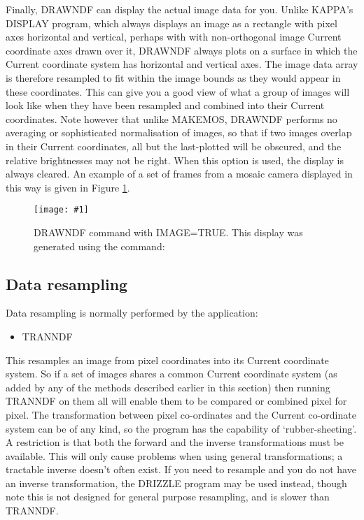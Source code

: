 \documentclass[twoside,11pt]{article}
\newcommand{\htmladdimg}[1]{}
\newcommand{\htmlref}[2]{#1}
\newcommand{\xlabel}[1]{}
\renewcommand{\_}{\texttt{\symbol{95}}}
\newcommand{\routine}[1]{{\sc #1}}
\newcommand{\xroutine}[1]{\htmlref{{\sc #1}}{#1}}
\newcommand{\myfig} [5] {
  \begin{figure}
    \centering\texttt{[image: \#1]}
    \typeout{#1 inserted on page \arabic{page}}
    \caption{\label{#4}#5}
  \end{figure}
  }
\newcommand{\myfig}[5]{
    \htmladdimg{#3}\\
    Figure: \label{#4} #5
    }
\begin{document}
Finally, \routine{DRAWNDF} can display the actual image data for you.
Unlike KAPPA's DISPLAY program, which always displays
an image as a rectangle with pixel axes horizontal and vertical, 
perhaps with with non-orthogonal image Current coordinate axes 
drawn over it, \routine{DRAWNDF} always plots on a surface in which the 
Current coordinate system has horizontal and vertical axes.
The image data array is therefore resampled to fit within the
image bounds as they would appear in these coordinates. 
This can give you a good view of what a group of images will 
look like when they have been resampled and combined into their
Current coordinates.  Note however that unlike \xroutine{MAKEMOS},
\routine{DRAWNDF} performs no averaging or sophisticated normalisation of
images, so that if two images overlap in their Current coordinates,
all but the last-plotted will be obscured, and the relative
brightnesses may not be right. 
When this option is used, the display is always cleared.
An example of a set of frames from a mosaic camera displayed 
in this way is given in Figure \ref{OUTIM}.

\myfig{sun139outim.eps}{height=0.5\textheight}{outim.gif}{OUTIM}{DRAWNDF
command with IMAGE=TRUE.  This display was generated using the
command:\protect\\
\hspace*{2em}{\tt drawndf "r10629?" image=yes}}


\subsection{\xlabel{resampling}\label{resampling}Data resampling}

Data resampling is normally performed by the application:
\begin{itemize}
\item \xroutine{TRANNDF}
\end{itemize}
This resamples an image from pixel coordinates into
its Current coordinate system.
So if a set of images shares a common Current coordinate system
(as added by any of the methods described earlier in this section)
then running \routine{TRANNDF} on them all will enable them to
be compared or combined pixel for pixel.
The transformation between pixel co-ordinates and the Current
co-ordinate system can be of any kind,
so the program has the capability of `rubber-sheeting'.
A restriction is that both the forward and the inverse transformations
must be available. This will only cause problems when using general
transformations; a tractable inverse doesn't often exist.
If you need to resample and you do not have an inverse transformation, 
the \xroutine{DRIZZLE} program
may be used instead, though note this is not designed for general
purpose resampling, and is slower than \routine{TRANNDF}.
\end{document}
